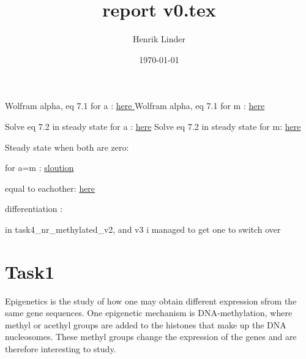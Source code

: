 \documentclass{article}
\title{report v0.tex }
\author{Henrik Linder}
\date{\today}
\begin{document}
\maketitle

Wolfram alpha, eq 7.1 for a  : \href{https://www.wolframalpha.com/input?i=solve+0+\%3D+alpha*\%28a*\%281-a-m\%29+-+a*m\%29+\%2B+\%281+-+alpha\%29*\%28\%281-a-m\%29\%2F2+-+a\%29+for+a+}{here }
Wolfram alpha, eq 7.1 for m  : \href{https://www.wolframalpha.com/input?i=solve+0+%3D+alpha*%28a*%281-a-m%29+-+a*m%29+%2B+%281+-+alpha%29*%28%281-a-m%29%2F2+-+a%29+for+m}{here }

Solve eq 7.2 in steady state for a : \href{https://www.wolframalpha.com/input?i=solve+0+\%3D+alpha*\%28m*\%281-a-m\%29+-+a*m\%29+\%2B+\%281+-+alpha\%29*\%28\%281-a-m\%29\%2F2+-+a\%29+for+a+}{here}
Solve eq 7.2 in steady state for m: \href{https://www.wolframalpha.com/input?i=solve+0+%3D+alpha*%28m*%281-a-m%29+-+a*m%29+%2B+%281+-+alpha%29*%28%281-a-m%29%2F2+-+a%29+for+m}{here}




Steady state when both are zero: 

for a=m : 
\href{https://www.wolframalpha.com/input?i=solve+0+%3D+alpha*%28a*%281-a-a%29+-+a*a%29+%2B+%281+-+alpha%29*%28%281-a-a%29%2F2+-+a%29+for+a+}{sloution}

equal to eachother: 
\href{https://www.wolframalpha.com/input?i=solve+alpha*%28m*%281-a-m%29+-+a*m%29+%2B+%281+-+alpha%29*%28%281-a-m%29%2F2+-+m%29++%3D+alpha*%28a*%281-a-m%29+-+a*m%29+%2B+%281+-+alpha%29*%28%281-a-m%29%2F2+-+a%29+for+a+}{here}



differentiation : 



in task4\_nr\_methylated\_v2, and v3 i managed to get one to switch over 




\section{Task1}
Epigenetics is the study of how one may obtain different expression sfrom the same gene sequences. One epigenetic mechanism is DNA-methylation, where methyl or acethyl groups are added to the histones that make up the DNA nucleosomes. These methyl groups change the expression of the genes and are therefore interesting to study.
\end{document}

